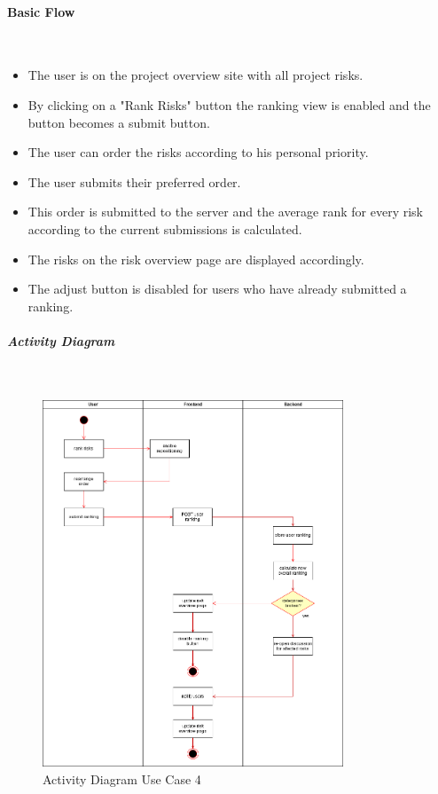 \paragraph*{Basic Flow} \mbox{}\\
\begin{itemize}
	\vspace{-3mm}
	\setlength\itemsep{-1em}
	\item The user is on the project overview site with all project risks.
	\item By clicking on a "Rank Risks" button the ranking view is enabled and the button becomes a submit button.
	\item The user can order the risks according to his personal priority.
	\item The user submits their preferred order.
	\item This order is submitted to the server and the average rank for every risk according to the current submissions is calculated.
	\item The risks on the risk overview page are displayed accordingly.
	\item The adjust button is disabled for users who have already submitted a ranking.
\end{itemize}
\newpage
\subparagraph{Activity Diagram}\mbox{}\\
\begin{figure}[H]
	\centering
	\includegraphics[width=0.8\textwidth]{Content/Domain/UC4RiskAdjustmentDiagram.png}
	\caption{Activity Diagram Use Case 4}
	\label{fig:label44}
\end{figure}
\newpage
